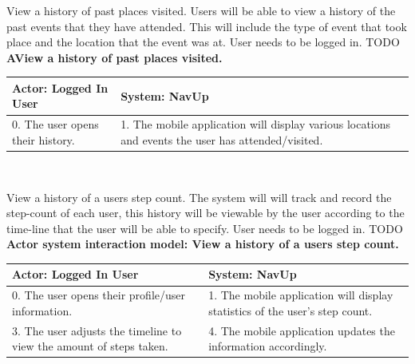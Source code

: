 \FuncReq
{View a history of past places visited.}
{Users will be able to view a history of the past events that they have attended. This will include the type of event that took place and the location that the event was at.}
{User needs to be logged in.}
{TODO}
\\
    \textbf{AView a history of past places visited. }\\
    \begin{tabular}{ | p{6cm} | p{6cm} |}
    \hline
    Actor: Logged In User & System: NavUp \\ \hline
    0. The user opens their history. & 1. The mobile application will display various locations and events the user has attended/visited.\\ \hline
    \end{tabular}
\\
\bigskip

\FuncReq
{View a history of a users step count.}
{The system will will track and record the step-count of each user, this history will be viewable by the user according to the time-line that the user will be able to specify.}
{User needs to be logged in.}
{TODO}
\\
    \textbf{Actor system interaction model: View a history of a users step count. }\\
    \begin{tabular}{ | p{6cm} | p{6cm} |}
    \hline
    Actor: Logged In User & System: NavUp \\ \hline
    0. The user opens their profile/user information. & 1. The mobile application will display statistics of the user's step count.\\ \hline
    3. The user adjusts the timeline to view the amount of steps taken. & 4. The mobile application updates the information accordingly. \\ \hline
    \end{tabular}
\\
\bigskip
